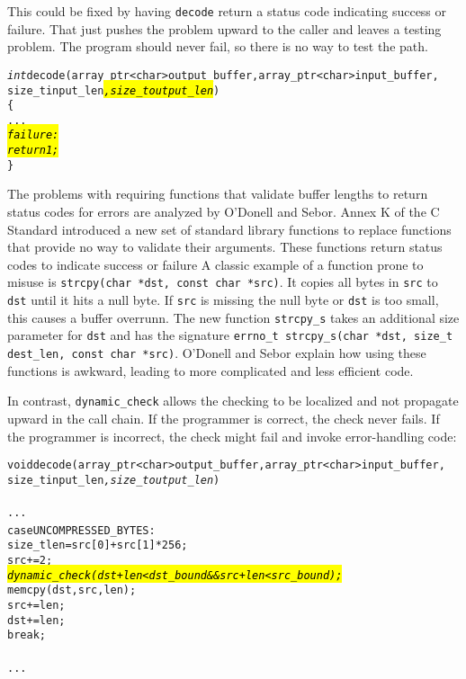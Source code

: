 This could be fixed by having \texttt{decode} return a status code
indicating success or failure. That just pushes the problem upward to
the caller and leaves a testing problem. The program should never fail,
so there is no way to test the path.

\begin{alltt}
\textit{int} decode(array\_ptr<char> output\_buffer, array\_ptr<char> input\_buffer, 
            size\_t input\_len\hl{\textit{, size\_t output\_len}})
\{
   ...
\hl{\textit{   failure:}}
\hl{\textit{      return 1;}}
\}
\end{alltt}

The problems with requiring functions that validate buffer lengths to
return status codes for errors are analyzed by O'Donell and Sebor\cite{ODonell2015}. 
Annex K of the C Standard \cite{ISO2011} introduced a new set of standard library functions to replace
functions that provide no way to validate their arguments. These
functions return status codes to indicate success or failure A classic
example of a function prone to misuse is \texttt{strcpy(char *dst, const
char *src)}. It copies all bytes in \texttt{src} to \texttt{dst} until
it hits a null byte. If \texttt{src} is missing the null byte or
\texttt{dst} is too small, this causes a buffer overrunn. The new
function \texttt{strcpy\_s} takes an additional size parameter for
\texttt{dst} and has the signature \texttt{errno\_t strcpy\_s(char *dst,
size\_t dest\_len, const char *src)}. O'Donell and Sebor explain how
using these functions is awkward, leading to more complicated and less
efficient code.

In contrast, \texttt{dynamic\_check} allows the checking to be localized
and not propagate upward in the call chain. If the programmer is
correct, the check never fails. If the programmer is incorrect, the
check might fail and invoke error-handling code:

\begin{alltt}
void decode(array\_ptr<char> output\_buffer, array\_ptr<char> input\_buffer, 
            size\_t input\_len\textit{, size\_t output\_len})
{
      ...
            case UNCOMPRESSED\_BYTES: { 
                size\_t len = src[0] + src[1]*256;
                src += 2;
                \hl{\textit{dynamic\_check(dst + len < dst\_bound && src + len < src_bound);}}
                memcpy(dst, src, len);
                src += len;
                dst += len;                
                break;
            }
   ...
}
\end{alltt}

